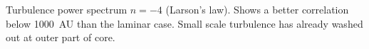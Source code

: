 \label{Fig:Lars1}
Turbulence power spectrum $n=-4$ (Larson's law). Shows a better correlation below 1000~AU than the laminar case. Small scale turbulence has already washed out at outer part of core.